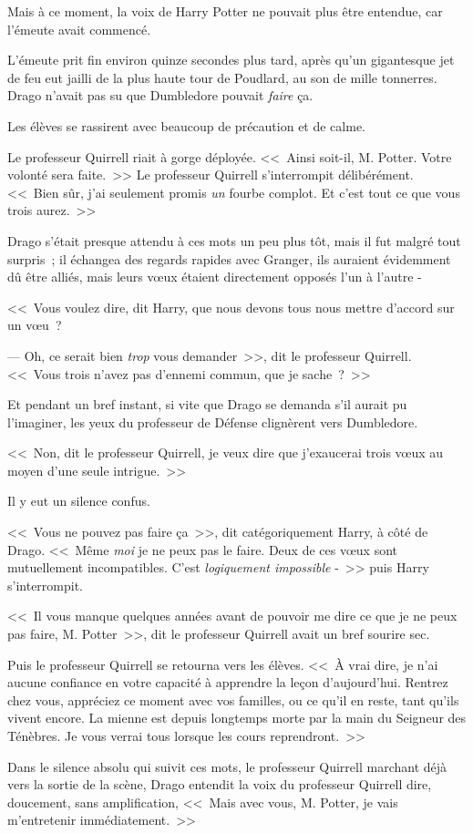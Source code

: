 Mais à ce moment, la voix de Harry Potter ne pouvait plus être entendue, car l'émeute avait commencé.

\later

L'émeute prit fin environ quinze secondes plus tard, après qu'un gigantesque jet de feu eut jailli de la plus haute tour de Poudlard, au son de mille tonnerres. Drago n'avait pas su que Dumbledore pouvait \emph{faire} ça.

Les élèves se rassirent avec beaucoup de précaution et de calme.

Le professeur Quirrell riait à gorge déployée. <<~Ainsi soit-il, M. Potter. Votre volonté sera faite.~>> Le professeur Quirrell s'interrompit délibérément. <<~Bien sûr, j'ai seulement promis \emph{un} fourbe complot. Et c'est tout ce que vous trois aurez.~>>

Drago s'était presque attendu à ces mots un peu plus tôt, mais il fut malgré tout surpris~; il échangea des regards rapides avec Granger, ils auraient évidemment dû être alliés, mais leurs vœux étaient directement opposés l'un à l'autre -

<<~Vous voulez dire, dit Harry, que nous devons tous nous mettre d'accord sur un vœu~?

--- Oh, ce serait bien \emph{trop} vous demander~>>, dit le professeur Quirrell. <<~Vous trois n'avez pas d'ennemi commun, que je sache~?~>>

Et pendant un bref instant, si vite que Drago se demanda s'il aurait pu l'imaginer, les yeux du professeur de Défense clignèrent vers Dumbledore.

<<~Non, dit le professeur Quirrell, je veux dire que j'exaucerai trois vœux au moyen d'une seule intrigue.~>>

Il y eut un silence confus.

<<~Vous ne pouvez pas faire ça~>>, dit catégoriquement Harry, à côté de Drago. <<~Même \emph{moi} je ne peux pas le faire. Deux de ces vœux sont mutuellement incompatibles. C'est \emph{logiquement impossible} -~>> puis Harry s'interrompit.

<<~Il vous manque quelques années avant de pouvoir me dire ce que je ne peux pas faire, M. Potter~>>, dit le professeur Quirrell avait un bref sourire sec.

Puis le professeur Quirrell se retourna vers les élèves. <<~À vrai dire, je n'ai aucune confiance en votre capacité à apprendre la leçon d'aujourd'hui. Rentrez chez vous, appréciez ce moment avec vos familles, ou ce qu'il en reste, tant qu'ils vivent encore. La mienne est depuis longtemps morte par la main du Seigneur des Ténèbres. Je vous verrai tous lorsque les cours reprendront.~>>

Dans le silence absolu qui suivit ces mots, le professeur Quirrell marchant déjà vers la sortie de la scène, Drago entendit la voix du professeur Quirrell dire, doucement, sans amplification, <<~Mais avec vous, M. Potter, je vais m'entretenir immédiatement.~>>
